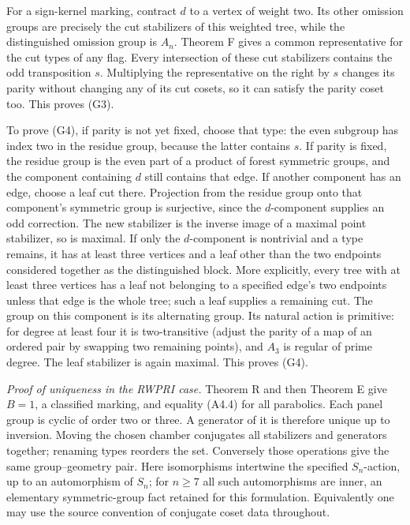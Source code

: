 \documentclass[
  10pt,
  letterpaper,
]{article}
\begin{document}
For a sign-kernel marking, contract \(d\) to a vertex of weight two. Its
other omission groups are precisely the cut stabilizers of this weighted
tree, while the distinguished omission group is \(A_n\). Theorem F gives
a common representative for the cut types of any flag. Every
intersection of these cut stabilizers contains the odd transposition
\(s\). Multiplying the representative on the right by \(s\) changes its
parity without changing any of its cut cosets, so it can satisfy the
parity coset too. This proves (G3).

To prove (G4), if parity is not yet fixed, choose that type: the even
subgroup has index two in the residue group, because the latter contains
\(s\). If parity is fixed, the residue group is the even part of a
product of forest symmetric groups, and the component containing \(d\)
still contains that edge. If another component has an edge, choose a
leaf cut there. Projection from the residue group onto that component's
symmetric group is surjective, since the \(d\)-component supplies an odd
correction. The new stabilizer is the inverse image of a maximal point
stabilizer, so is maximal. If only the \(d\)-component is nontrivial and
a type remains, it has at least three vertices and a leaf other than the
two endpoints considered together as the distinguished block. More
explicitly, every tree with at least three vertices has a leaf not
belonging to a specified edge's two endpoints unless that edge is the
whole tree; such a leaf supplies a remaining cut. The group on this
component is its alternating group. Its natural action is primitive: for
degree at least four it is two-transitive (adjust the parity of a map of
an ordered pair by swapping two remaining points), and \(A_3\) is
regular of prime degree. The leaf stabilizer is again maximal. This
proves (G4).

\emph{Proof of uniqueness in the RWPRI case.} Theorem R and then Theorem
E give \(B=1\), a classified marking, and equality (A4.4) for all
parabolics. Each panel group is cyclic of order two or three. A
generator of it is therefore unique up to inversion. Moving the chosen
chamber conjugates all stabilizers and generators together; renaming
types reorders the set. Conversely those operations give the same
group--geometry pair. Here isomorphisms intertwine the specified
\(S_n\)-action, up to an automorphism of \(S_n\); for \(n\geq7\) all
such automorphisms are inner, an elementary symmetric-group fact
retained for this formulation. Equivalently one may use the source
convention of conjugate coset data throughout.
\end{document}
